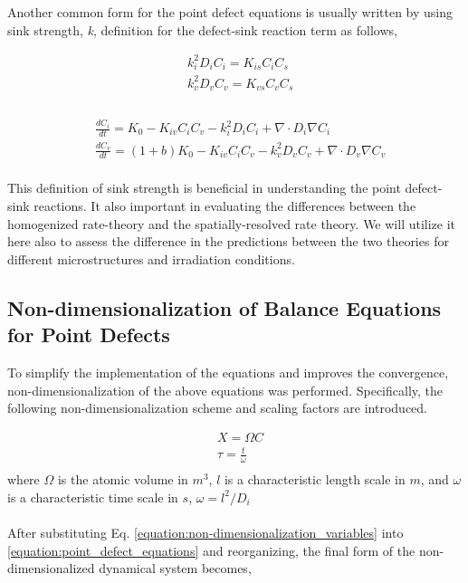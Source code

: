 \documentclass[utf8]{frontiersSCNS} %
\begin{document}
    Another common form for the point defect equations is usually written by using sink strength, \textit{k},  definition for the defect-sink reaction term as follows,

\begin{equation}
  \begin{aligned}
    &k_i^2D_iC_i = K_{is}C_iC_s \\
    &k_v^2D_vC_v = K_{vs}C_vC_s \\
  \end{aligned}
  \label{equation:sink_reaction_term}
\end{equation}\\
\begin{equation}
  \begin{aligned}
    &\frac{dC_i}{dt} = K_0 - K_{iv}C_iC_v - k_i^2D_iC_i + \nabla\cdot D_i\nabla C_i\\
    &\frac{dC_v}{dt} = (1+b)K_0 - K_{iv}C_iC_v - k_v^2D_vC_v + \nabla\cdot D_v\nabla C_v\\
  \end{aligned}
  \label{equation:point_defect_equations_sink_strength}
\end{equation}

    This definition of sink strength is beneficial in understanding the point defect-sink reactions. It also important in evaluating the differences between the homogenized rate-theory and the spatially-resolved rate theory. We will utilize it here also to assess the  difference in the predictions between the two theories for different microstructures and irradiation conditions. 

\subsection{Non-dimensionalization of Balance Equations for Point Defects}
    To simplify the implementation of the equations and improves the convergence, non-dimensionalization of the above equations was performed. Specifically, the following non-dimensionalization scheme and scaling factors are introduced.

    \begin{equation}
      \begin{aligned}
        &X = \Omega C\\
        &\tau = \frac{t}{\omega}\\
      \end{aligned}
      \label{equation:non-dimensionalization_variables}
    \end{equation}
    where ${\Omega}$ is the atomic volume in ${m^3}$, ${l}$ is a characteristic length scale in ${m}$, and ${\omega}$ is a characteristic time scale in ${s}$, ${\omega= l^2/D_i}$\\
    \\
    After substituting Eq. \ref{equation:non-dimensionalization_variables} into \ref{equation:point_defect_equations} and reorganizing, the final form  of the non-dimensionalized dynamical system becomes,
\end{document}
